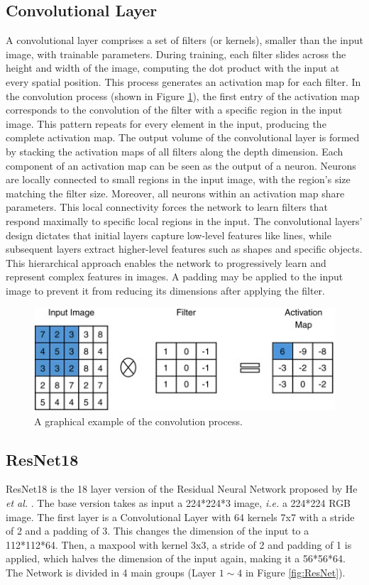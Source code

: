 \subsection{Convolutional Layer}
A convolutional layer comprises a set of filters (or kernels), smaller than the input image, with trainable parameters. During training, each filter slides across the height and width of the image, computing the dot product with the input at every spatial position. This process generates an activation map for each filter. In the convolution process (shown in Figure \ref{fig:ConvLayer}), the first entry of the activation map corresponds to the convolution of the filter with a specific region in the input image. This pattern repeats for every element in the input, producing the complete activation map. The output volume of the convolutional layer is formed by stacking the activation maps of all filters along the depth dimension. Each component of an activation map can be seen as the output of a neuron. Neurons are locally connected to small regions in the input image, with the region's size matching the filter size. Moreover, all neurons within an activation map share parameters. This local connectivity forces the network to learn filters that respond maximally to specific local regions in the input. The convolutional layers' design dictates that initial layers capture low-level features like lines, while subsequent layers extract higher-level features such as shapes and specific objects. This hierarchical approach enables the network to progressively learn and represent complex features in images. A padding may be applied to the input image to prevent it from reducing its dimensions after applying the filter.

\begin{figure}[H]
    \centering
    \includegraphics[width=0.7\linewidth]{Images/ConvLayer.png}
    \caption{A graphical example of the convolution process.}
    \label{fig:ConvLayer}
\end{figure}

\subsection{ResNet18}
ResNet18 is the 18 layer version of the Residual Neural Network proposed by He \textit{et al.} \cite{he2016deep}. The base version takes as input a 224*224*3 image, \textit{i.e.} a 224*224 RGB image. The first layer is a Convolutional Layer with 64 kernels 7x7 with a stride of 2 and a padding of 3. This changes the dimension of the input to a 112*112*64. Then, a maxpool  with kernel 3x3, a stride of 2 and padding of 1 is applied, which halves the dimension of the input again, making it a 56*56*64. The Network is divided in 4 main groups (Layer $1\sim4$ in Figure \ref{fig:ResNet}).

